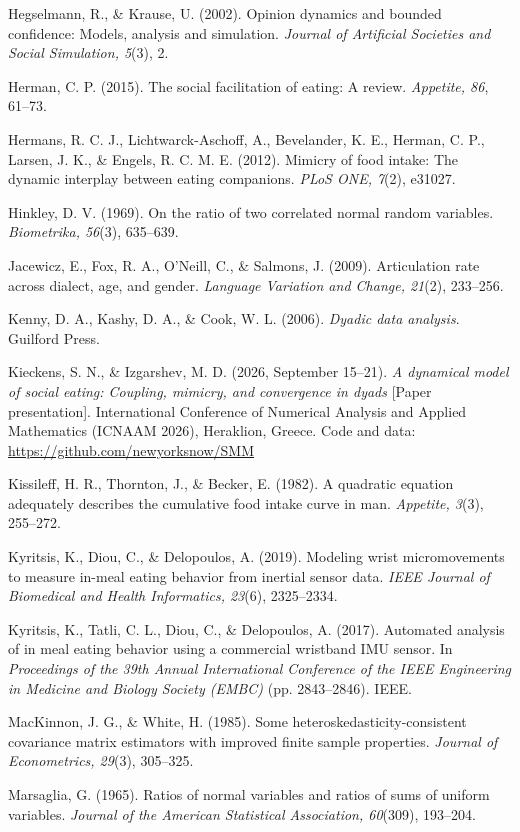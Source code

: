 \documentclass[12pt]{article}
\begin{document}
Hegselmann, R., \& Krause, U. (2002). Opinion dynamics and bounded confidence: Models, analysis and simulation. \emph{Journal of Artificial Societies and Social Simulation, 5}(3), 2.

Herman, C. P. (2015). The social facilitation of eating: A review. \emph{Appetite, 86}, 61--73.

Hermans, R. C. J., Lichtwarck-Aschoff, A., Bevelander, K. E., Herman, C. P., Larsen, J. K., \& Engels, R. C. M. E. (2012). Mimicry of food intake: The dynamic interplay between eating companions. \emph{PLoS ONE, 7}(2), e31027.

Hinkley, D. V. (1969). On the ratio of two correlated normal random variables. \emph{Biometrika, 56}(3), 635--639.

Jacewicz, E., Fox, R. A., O'Neill, C., \& Salmons, J. (2009). Articulation rate across dialect, age, and gender. \emph{Language Variation and Change, 21}(2), 233--256.

Kenny, D. A., Kashy, D. A., \& Cook, W. L. (2006). \emph{Dyadic data analysis}. Guilford Press.

Kieckens, S. N., \& Izgarshev, M. D. (2026, September 15--21). \emph{A dynamical model of social eating: Coupling, mimicry, and convergence in dyads} [Paper presentation]. International Conference of Numerical Analysis and Applied Mathematics (ICNAAM 2026), Heraklion, Greece. Code and data: \url{https://github.com/newyorksnow/SMM}

Kissileff, H. R., Thornton, J., \& Becker, E. (1982). A quadratic equation adequately describes the cumulative food intake curve in man. \emph{Appetite, 3}(3), 255--272.

Kyritsis, K., Diou, C., \& Delopoulos, A. (2019). Modeling wrist micromovements to measure in-meal eating behavior from inertial sensor data. \emph{IEEE Journal of Biomedical and Health Informatics, 23}(6), 2325--2334.

Kyritsis, K., Tatli, C. L., Diou, C., \& Delopoulos, A. (2017). Automated analysis of in meal eating behavior using a commercial wristband IMU sensor. In \emph{Proceedings of the 39th Annual International Conference of the IEEE Engineering in Medicine and Biology Society (EMBC)} (pp. 2843--2846). IEEE.

MacKinnon, J. G., \& White, H. (1985). Some heteroskedasticity-consistent covariance matrix estimators with improved finite sample properties. \emph{Journal of Econometrics, 29}(3), 305--325.

Marsaglia, G. (1965). Ratios of normal variables and ratios of sums of uniform variables. \emph{Journal of the American Statistical Association, 60}(309), 193--204.
\end{document}
